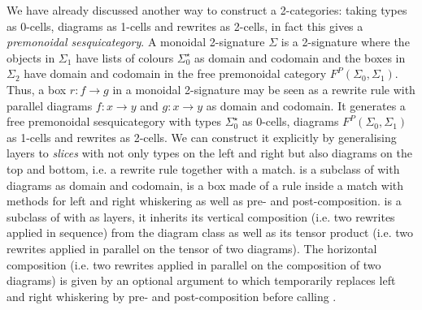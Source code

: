 We have already discussed another way to construct a 2-categories: taking types as 0-cells, diagrams as 1-cells and rewrites as 2-cells, in fact this gives a \emph{premonoidal sesquicategory}.
A monoidal 2-signature $\Sigma$ is a 2-signature where the objects in $\Sigma_1$ have lists of colours $\Sigma_0^\star$ as domain and codomain and the boxes in $\Sigma_2$ have domain and codomain in the free premonoidal category $F^P(\Sigma_0, \Sigma_1)$.
Thus, a box $r : f \to g$ in a monoidal 2-signature may be seen as a rewrite rule with parallel diagrams $f : x \to y$ and $g : x \to y$ as domain and codomain.
It generates a free premonoidal sesquicategory with types $\Sigma_0^\star$ as 0-cells, diagrams $F^P(\Sigma_0, \Sigma_1)$ as 1-cells and rewrites as 2-cells.
We can construct it explicitly by generalising layers to \emph{slices} with not only types on the left and right but also diagrams on the top and bottom, i.e. a rewrite rule together with a match.
 is a subclass of  with diagrams as domain and codomain,  is a box made of a rule inside a match with methods for left and right whiskering as well as pre- and post-composition.
 is a subclass of  with  as layers, it inherits its vertical composition (i.e. two rewrites applied in sequence) from the diagram class as well as its tensor product (i.e. two rewrites applied in parallel on the tensor of two diagrams).
The horizontal composition (i.e. two rewrites applied in parallel on the composition of two diagrams) is given by an optional argument to  which temporarily replaces left and right whiskering by pre- and post-composition before calling .

